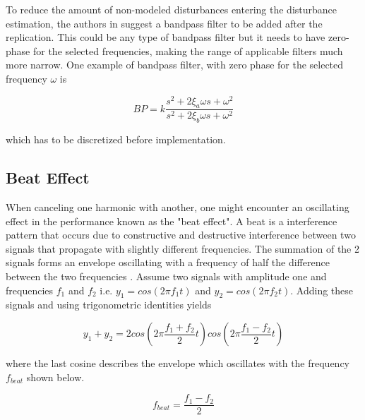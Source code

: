 To reduce the amount of non-modeled disturbances entering the disturbance estimation, the authors in \citep{fujimoto2004repetitive} suggest a bandpass filter to be added after the replication. This could be any type of bandpass filter but it needs to have zero-phase for the selected frequencies, making the range of applicable filters much more narrow. One example of bandpass filter, with zero phase for the selected frequency $\omega$ is

\begin{equation}
  \label{eq:bandpass}
  BP = k\frac{s^2 + 2\xi_a\omega s + \omega^2}{s^2 + 2\xi_b\omega s + \omega^2}
\end{equation}

which has to be discretized before implementation.

\subsection{Beat Effect}\label{subsec:beat}
When canceling one harmonic with another, one might encounter an oscillating effect in the performance known as the "beat effect".
A beat is a interference pattern that occurs due to constructive and destructive interference between two signals that propagate with slightly different frequencies. The summation of the 2 signals forms an envelope oscillating with a frequency of half the difference between the two frequencies \citep{beat:2016}. Assume two signals with amplitude one and frequencies $f_1$ and $f_2$ i.e. $y_1 = cos(2\pi f_1t)$ and $y_2 = cos(2\pi f_2t)$. Adding these signals and using trigonometric identities yields

\begin{equation}
  y_1 + y_2 = 2cos(2\pi\frac{f_1+f_2}{2}t)cos(2\pi\frac{f_1-f_2}{2}t)
\end{equation}

where the last cosine describes the envelope which oscillates with the frequency $f_{beat}$ shown below.

\begin{equation}
  f_{beat} = \frac{f_1-f_2}{2}
\end{equation}



